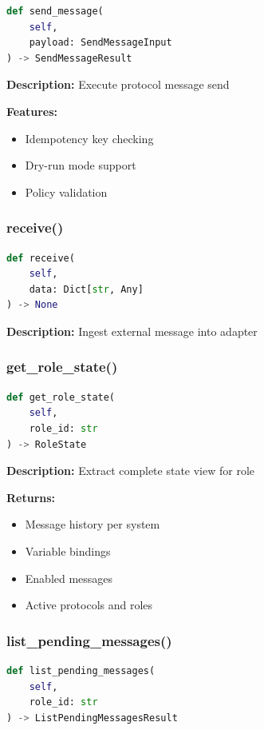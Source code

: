 \documentclass[11pt,a4paper]{article}
\begin{document}
\begin{lstlisting}[language=Python]
def send_message(
    self,
    payload: SendMessageInput
) -> SendMessageResult
\end{lstlisting}

\textbf{Description:} Execute protocol message send

\textbf{Features:}
\begin{itemize}
    \item Idempotency key checking
    \item Dry-run mode support
    \item Policy validation
\end{itemize}

\subsubsection{receive()}

\begin{lstlisting}[language=Python]
def receive(
    self,
    data: Dict[str, Any]
) -> None
\end{lstlisting}

\textbf{Description:} Ingest external message into adapter

\subsubsection{get\_role\_state()}

\begin{lstlisting}[language=Python]
def get_role_state(
    self,
    role_id: str
) -> RoleState
\end{lstlisting}

\textbf{Description:} Extract complete state view for role

\textbf{Returns:}
\begin{itemize}
    \item Message history per system
    \item Variable bindings
    \item Enabled messages
    \item Active protocols and roles
\end{itemize}

\subsubsection{list\_pending\_messages()}

\begin{lstlisting}[language=Python]
def list_pending_messages(
    self,
    role_id: str
) -> ListPendingMessagesResult
\end{lstlisting}
\end{document}
